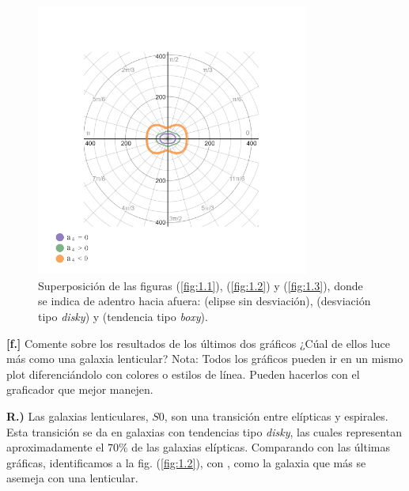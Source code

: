 \documentclass[paper=a4, fontsize=10pt]{scrartcl} %
\begin{document}
\begin{figure}[h]
\begin{center}
\includegraphics[width=0.8\textwidth]{final_3_}
\caption{Superposición de las figuras (\ref{fig:1.1}), (\ref{fig:1.2}) y (\ref{fig:1.3}), donde se indica de adentro hacia afuera: {\color{Fuchsia}{$a_0=0$}} (elipse sin desviación), {\color{OliveGreen}{$a_4 > 0$}} (desviación tipo {\textit{disky}) y {\color{orange}{$a_4 < 0$}} (tendencia tipo {\textit{boxy}}).}}
\label{fig:1.4} 
\end{center}
\end{figure}



\newpage 

{\bf{[f.]}} Comente sobre los resultados de los últimos dos gráficos ¿Cúal de ellos luce más como una galaxia lenticular? Nota: Todos los gráficos pueden ir en un mismo plot diferenciándolo con colores o estilos de línea. Pueden hacerlos con el graficador que mejor manejen. 

\vspace{0.3cm} 

{\bf{R.)}} Las galaxias lenticulares, $S0$, son una transición entre elípticas y espirales. Esta transición se da en galaxias con tendencias tipo {\textit{disky}}, las cuales representan aproximadamente el $70 \%$ de las galaxias elípticas. Comparando con las últimas gráficas, identificamos a la fig. (\ref{fig:1.2}), con {\color{OliveGreen}{$a_4 > 0$}}, como la galaxia que más se asemeja con una lenticular.
 
\newpage 
\end{document}
